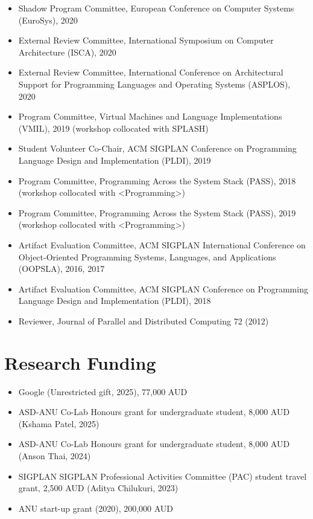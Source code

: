 \documentclass[11pt,a4paper,sans]{moderncv}
\begin{document}
{\begin{itemize}
\item Shadow Program Committee, European Conference on Computer Systems (EuroSys), 2020
\item External Review Committee, International Symposium on Computer Architecture (ISCA), 2020
\item External Review Committee, International Conference on Architectural Support for Programming Languages and Operating Systems (ASPLOS), 2020
\item Program Committee, Virtual Machines and Language Implementations (VMIL), 2019 (workshop collocated with SPLASH)
\item Student Volunteer Co-Chair, ACM SIGPLAN Conference on Programming Language Design and Implementation (PLDI), 2019
\item Program Committee, Programming Across the System Stack (PASS), 2018 (workshop collocated with \textless Programming\textgreater) 
\item Program Committee, Programming Across the System Stack (PASS), 2019 (workshop collocated with \textless Programming\textgreater) 
\item Artifact Evaluation Committee, ACM SIGPLAN International Conference on Object-Oriented Programming Systems, Languages, and Applications (OOPSLA), 2016, 2017  
\item Artifact Evaluation Committee, ACM SIGPLAN Conference on Programming Language Design and Implementation (PLDI), 2018
\item Reviewer, Journal of Parallel and Distributed Computing 72 (2012) 
\end{itemize}
}

\section{Research Funding}
{\small
\begin{itemize}
\item Google (Unrestricted gift, 2025), 77{,}000 AUD
\item ASD-ANU Co-Lab Honours grant for undergraduate student, 8{,}000 AUD (Kshama Patel, 2025) 
\item ASD-ANU Co-Lab Honours grant for undergraduate student, 8{,}000 AUD (Anson Thai, 2024)
\item SIGPLAN SIGPLAN Professional Activities Committee (PAC) student travel grant, 2{,}500 AUD (Aditya Chilukuri, 2023)
\item ANU start-up grant (2020), 200{,}000 AUD
\end{itemize}
}
\end{document}
